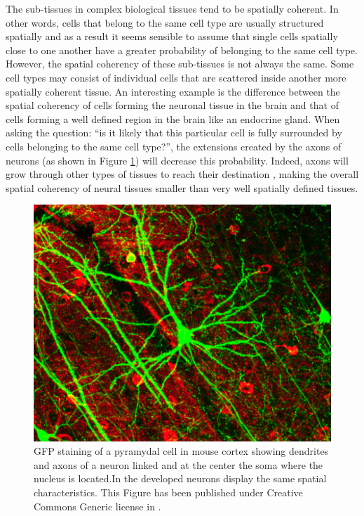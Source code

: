      
    The sub-tissues in complex biological tissues tend to be spatially coherent. In other words, cells that belong to the same cell type are usually structured spatially and as a result it seems sensible to assume that single cells spatially close to one another have a greater probability of belonging to the same cell type. However, the spatial coherency of these sub-tissues is not always the same. Some cell types may consist of individual cells that are scattered inside another more spatially coherent tissue. An interesting example is the difference between the spatial coherency of cells forming the neuronal tissue in the brain and that of cells forming a well defined region in the brain like an endocrine gland. When asking the question: ``is it likely that this particular cell is fully surrounded by cells belonging to the same cell type?'', the extensions created by the axons of neurons (as shown in Figure \ref{fig:neuron}) will decrease this probability. Indeed, axons will grow through other types of tissues to reach their destination \citep{bartlett84,colello90}, making the overall spatial coherency of neural tissues smaller than very well spatially defined tissues.\\
    
\begin{figure}[bth]
\begin{center}
  \includegraphics[width=0.8\linewidth]{gfx/chapter1/neuron.png}
\end{center}
  \caption{GFP staining of a pyramydal cell in mouse cortex showing dendrites and axons of a neuron linked and at the center the soma where the nucleus is located.In \platy{} the developed neurons display the same spatial characteristics. This Figure has been published under Creative Commons Generic license in \citep{lee06}.}
  \label{fig:neuron}
\end{figure}
	
